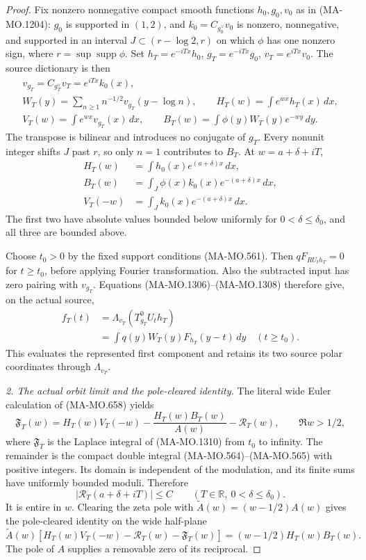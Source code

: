 \begin{proof}
Fix nonzero nonnegative compact smooth functions $h_0,g_0,v_0$ as in
(MA-MO.1204): $g_0$ is supported in $(1,2)$, and
$k_0=C_{g_0^\vee}v_0$ is nonzero, nonnegative, and supported
in an interval $J\subset(r-\log2,r)$ on which $\phi$ has
one nonzero sign, where $r=\sup\operatorname{supp}\phi$.
Set $h_T=e^{-iTx}h_0$, $g_T=e^{-iTx}g_0$, $v_T=e^{iTx}v_0$.
The source dictionary is then
\[
 \begin{gathered}
 v_{g_T}=C_{g_T^\vee}v_T=e^{iTx}k_0(x),\\
 W_T(y)=\sum_{n\ge1}n^{-1/2}v_{g_T}(y-\log n),\qquad
 H_T(w)=\int e^{wx}h_T(x)\,dx,\\
 V_T(w)=\int e^{wx}v_{g_T}(x)\,dx,
 \qquad B_T(w)=\int\phi(y)W_T(y)e^{-wy}\,dy.
 \end{gathered}
 \tag{MA-MO.1308}
\]
The transpose is bilinear and introduces no conjugate of $g_T$.
Every nonunit integer shifts $J$ past $r$, so only $n=1$
contributes to $B_T$.  At $w=a+\delta+iT$,
\[
 \begin{aligned}
 H_T(w)&=\int h_0(x)e^{(a+\delta)x}\,dx,\\
 B_T(w)&=\int_J\phi(x)k_0(x)e^{-(a+\delta)x}\,dx,\\
 V_T(-w)&=\int_Jk_0(x)e^{-(a+\delta)x}\,dx.
 \end{aligned}
 \tag{MA-MO.1309}
\]
The first two have absolute values bounded below uniformly
for $0<\delta\le\delta_0$, and all three are bounded above.

Choose $t_0>0$ by the fixed support conditions (MA-MO.561).
Then $qF_{RU_th_T}=0$ for $t\ge t_0$, before applying
Fourier transformation.  Also the subtracted input has zero
pairing with $v_{g_T}$.  Equations (MA-MO.1306)--(MA-MO.1308)
therefore give, on the actual source,
\[
 \begin{aligned}
 f_T(t)&=\Lambda_{v_T}(T_{g_T}^0U_th_T)\\
       &=\int q(y)W_T(y)F_{h_T}(y-t)\,dy
                                      \quad(t\ge t_0).
 \end{aligned}
 \tag{MA-MO.1310}
\]
This evaluates the represented first component and retains its
two source polar coordinates through $\Lambda_{v_T}$.

\emph{2. The actual orbit limit and the pole-cleared identity.}
The literal wide Euler calculation of (MA-MO.658) yields
\[
 \mathfrak F_T(w)=H_T(w)V_T(-w)
                  -\frac{H_T(w)B_T(w)}{A(w)}-\mathcal R_T(w),
                    \qquad \Re w>1/2,
 \tag{MA-MO.1311}
\]
where $\mathfrak F_T$ is the Laplace integral of (MA-MO.1310)
from $t_0$ to infinity.  The remainder is the compact double
integral (MA-MO.564)--(MA-MO.565) with positive integers.
Its domain is independent of the modulation, and its finite sums
have uniformly bounded moduli.  Therefore
\[
       |\mathcal R_T(a+\delta+iT)|\le C
                         \qquad(T\in\mathbb R,\ 0<\delta\le\delta_0).
 \tag{MA-MO.1312}
\]
It is entire in $w$.  Clearing the zeta pole with
$\widetilde A(w)=(w-1/2)A(w)$ gives the pole-cleared identity
on the wide half-plane
\[
 \widetilde A(w)[H_T(w)V_T(-w)-\mathcal R_T(w)-\mathfrak F_T(w)]
                       =(w-1/2)H_T(w)B_T(w).
 \tag{MA-MO.1313}
\]
The pole of $A$ supplies a removable zero of its reciprocal.


\end{proof}
